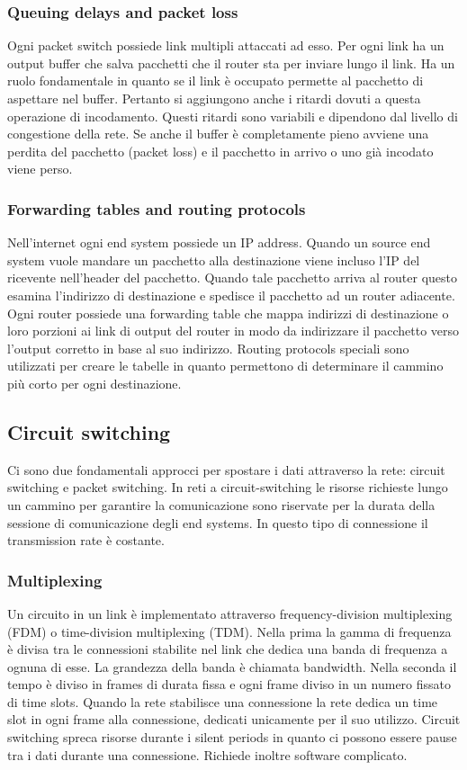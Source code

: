 \subsubsection{Queuing delays and packet loss}
Ogni packet switch possiede link multipli attaccati ad esso. Per ogni link ha un output buffer che salva pacchetti che il router sta per inviare lungo il link. Ha un ruolo fondamentale in quanto se il link \`e occupato
permette al pacchetto di aspettare nel buffer. Pertanto si aggiungono anche i ritardi dovuti a questa operazione di incodamento. Questi ritardi sono variabili e dipendono dal livello di congestione della rete.
Se anche il buffer \`e completamente pieno avviene una perdita del pacchetto (packet loss) e il pacchetto in arrivo o uno gi\`a incodato viene perso. 
\subsubsection{Forwarding tables and routing protocols}
Nell'internet ogni end system possiede un IP address. Quando un source end system vuole mandare un pacchetto alla destinazione viene incluso l'IP del ricevente nell'header del pacchetto. Quando tale 
pacchetto arriva al router questo esamina l'indirizzo di destinazione e spedisce il pacchetto ad un router adiacente. Ogni router possiede una forwarding table che mappa indirizzi di destinazione o loro porzioni 
ai link di output del router in modo da indirizzare il pacchetto verso l'output corretto in base al suo indirizzo. Routing protocols speciali sono utilizzati per creare le tabelle in quanto permettono di determinare
il cammino pi\`u corto per ogni destinazione.
\subsection{Circuit switching}
Ci sono due fondamentali approcci per spostare i dati attraverso la rete: circuit switching e packet switching. In reti a circuit-switching le risorse richieste lungo un cammino per garantire la comunicazione sono
riservate per la durata della sessione di comunicazione degli end systems. In questo tipo di connessione il transmission rate \`e costante. 
\subsubsection{Multiplexing}
Un circuito in un link \`e implementato attraverso frequency-division multiplexing (FDM) o time-division multiplexing (TDM). Nella prima la gamma di frequenza \`e divisa tra le connessioni stabilite nel link che
dedica una banda di frequenza a ognuna di esse. La grandezza della banda \`e chiamata bandwidth. Nella seconda il tempo \`e diviso in frames di durata fissa e ogni frame diviso in un numero fissato di time 
slots. Quando la rete stabilisce una connessione la rete dedica un time slot in ogni frame alla connessione, dedicati unicamente per il suo utilizzo. Circuit switching spreca risorse durante i silent periods in 
quanto ci possono essere pause tra i dati durante una connessione. Richiede inoltre software complicato. 
